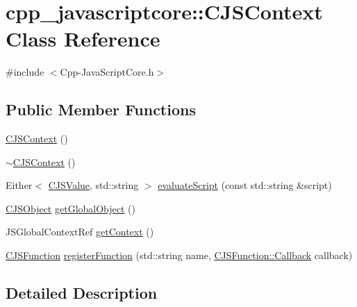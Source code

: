 \hypertarget{classcpp__javascriptcore_1_1_c_j_s_context}{}\section{cpp\+\_\+javascriptcore\+:\+:C\+J\+S\+Context Class Reference}
\label{classcpp__javascriptcore_1_1_c_j_s_context}


{\ttfamily \#include $<$Cpp-\/\+Java\+Script\+Core.\+h$>$}

\subsection*{Public Member Functions}
\begin{DoxyCompactItemize}
\item 
\mbox{\hyperlink{classcpp__javascriptcore_1_1_c_j_s_context_a2bb3c165dca01f4b7de91c5512d59d9e}{C\+J\+S\+Context}} ()
\item 
\mbox{\hyperlink{classcpp__javascriptcore_1_1_c_j_s_context_a5085045b6def320b1719e20b33987669}{$\sim$\+C\+J\+S\+Context}} ()
\item 
Either$<$ \mbox{\hyperlink{classcpp__javascriptcore_1_1_c_j_s_value}{C\+J\+S\+Value}}, std\+::string $>$ \mbox{\hyperlink{classcpp__javascriptcore_1_1_c_j_s_context_abe49a3875a40cb94e5e5249be7a91a9b}{evaluate\+Script}} (const std\+::string \&script)
\item 
\mbox{\hyperlink{classcpp__javascriptcore_1_1_c_j_s_object}{C\+J\+S\+Object}} \mbox{\hyperlink{classcpp__javascriptcore_1_1_c_j_s_context_a35e34df7a2ff0bcda8ef35d43947fa58}{get\+Global\+Object}} ()
\item 
J\+S\+Global\+Context\+Ref \mbox{\hyperlink{classcpp__javascriptcore_1_1_c_j_s_context_a2196952e270dc02a646febe5f054545b}{get\+Context}} ()
\item 
\mbox{\hyperlink{classcpp__javascriptcore_1_1_c_j_s_function}{C\+J\+S\+Function}} \mbox{\hyperlink{classcpp__javascriptcore_1_1_c_j_s_context_a8136d96922f8403ed268df9867af761c}{register\+Function}} (std\+::string name, \mbox{\hyperlink{classcpp__javascriptcore_1_1_c_j_s_function_a3cf83c4e33bfeafbe770047bb75556f5}{C\+J\+S\+Function\+::\+Callback}} callback)
\end{DoxyCompactItemize}


\subsection{Detailed Description}


